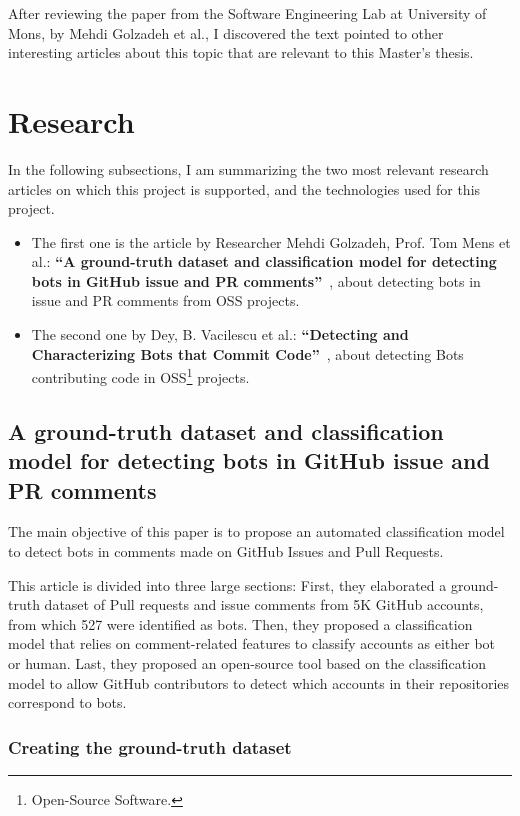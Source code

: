 \documentclass[a4paper, 12pt]{book}
\begin{document}
After reviewing the paper from the Software Engineering Lab at University of Mons, by Mehdi Golzadeh et al., I discovered the text pointed to other interesting articles about this topic that are relevant to this Master's thesis.

\section{Research}
\label{sec:research}

In the following subsections, I am summarizing the two most relevant research articles on which this project is supported, and the technologies used for this project.

\begin{itemize}
    \item The first one is the article by Researcher Mehdi Golzadeh, Prof. Tom Mens et al.: \textbf{``A ground-truth dataset and classification model for detecting bots in GitHub issue and PR comments''}~\cite{golzadeh-mens:ground-truth-github2021}, about detecting bots in issue and PR comments from OSS projects.
    \item The second one by Dey, B. Vacilescu et al.: \textbf{``Detecting and Characterizing Bots that Commit Code''}~\cite{dey-et-al-detecting-bots}, about detecting Bots contributing code in OSS\footnote{Open-Source Software.} projects.
\end{itemize}

\subsection{A ground-truth dataset and classification model for detecting bots in GitHub issue and PR comments}
\label{ssec:golzadeh}

The main objective of this paper is to propose an automated classification model to detect bots in comments made on GitHub Issues and Pull Requests.

This article is divided into three large sections: First, they elaborated a ground-truth dataset of Pull requests and issue comments from 5K GitHub accounts, from which 527 were identified as bots. Then, they proposed a classification model that relies on comment-related features to classify accounts as either bot or human. Last, they proposed an open-source tool based on the classification model to allow GitHub contributors to detect which accounts in their repositories correspond to bots.

\subsubsection{Creating the ground-truth dataset}
\label{sssec:golzadeh-dataset}
\end{document}
